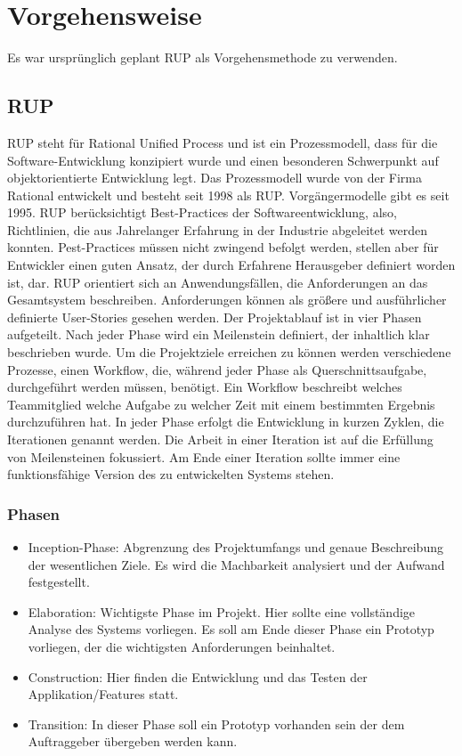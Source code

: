 \chapter{Vorgehensweise}
\reiter

	Es war ursprünglich geplant RUP als Vorgehensmethode zu verwenden. 

	\section{RUP}
	
	RUP steht für Rational Unified Process und ist ein Prozessmodell, dass für die Software-Entwicklung konzipiert wurde und einen besonderen Schwerpunkt auf objektorientierte Entwicklung legt. Das Prozessmodell wurde von der Firma Rational entwickelt und besteht seit 1998 als RUP. Vorgängermodelle gibt es seit 1995. 
RUP berücksichtigt Best-Practices der Softwareentwicklung, also, Richtlinien, die aus Jahrelanger Erfahrung in der Industrie abgeleitet werden konnten. Pest-Practices müssen nicht zwingend befolgt werden, stellen aber für Entwickler einen guten Ansatz, der durch Erfahrene Herausgeber definiert worden ist, dar. 
RUP orientiert sich an Anwendungsfällen, die Anforderungen an das Gesamtsystem beschreiben. Anforderungen können als größere und ausführlicher definierte User-Stories gesehen werden.  
Der Projektablauf ist in vier Phasen aufgeteilt. Nach jeder Phase wird ein Meilenstein definiert, der inhaltlich klar beschrieben wurde.
Um die Projektziele erreichen zu können werden verschiedene Prozesse, einen Workflow, die, während jeder Phase als Querschnittsaufgabe, durchgeführt werden müssen, benötigt. Ein Workflow beschreibt welches Teammitglied welche Aufgabe zu welcher Zeit mit einem bestimmten Ergebnis durchzuführen hat.
In jeder Phase erfolgt die Entwicklung in kurzen Zyklen, die Iterationen genannt werden. Die Arbeit in einer Iteration ist auf die Erfüllung von Meilensteinen fokussiert. Am Ende einer Iteration sollte immer eine funktionsfähige Version des zu entwickelten Systems stehen. 

	\subsection{Phasen}
	\begin{itemize}
		\item Inception-Phase: Abgrenzung des Projektumfangs und genaue Beschreibung der wesentlichen Ziele. Es wird die Machbarkeit analysiert und der Aufwand festgestellt.
		\item Elaboration: Wichtigste Phase im Projekt. Hier sollte eine vollständige Analyse des Systems vorliegen. Es soll am Ende dieser Phase ein Prototyp vorliegen, der die wichtigsten Anforderungen beinhaltet.
		\item Construction: Hier finden die Entwicklung und das Testen der Applikation/Features statt.
		\item Transition: In dieser Phase soll ein Prototyp vorhanden sein der dem Auftraggeber übergeben werden kann. 
	\end{itemize}
	
